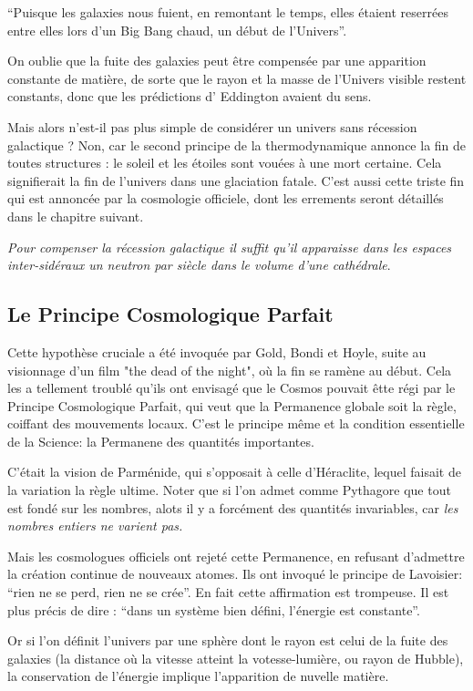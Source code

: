 \documentclass[a4paper,12pt]{article}
\begin{document}
``Puisque les galaxies nous fuient, en remontant le temps, elles étaient reserrées entre elles lors d'un Big Bang chaud, un début de l'Univers''.

On oublie que la fuite des galaxies peut être compensée par une apparition constante de matière, de sorte que le rayon et la masse de l'Univers visible restent constants, donc que les prédictions d' Eddington avaient du sens.

Mais alors n'est-il pas plus simple de considérer un univers sans récession galactique ? Non, car le second principe de la thermodynamique annonce la fin de toutes structures : le soleil et les étoiles sont vouées à une mort certaine. Cela signifierait la fin de l'univers dans une glaciation fatale.  C'est aussi cette triste fin qui est annoncée par la cosmologie officiele, dont les errements seront détaillés dans le chapitre suivant.

\textit{Pour compenser la récession galactique il suffit qu'il apparaisse dans les espaces inter-sidéraux un neutron par siècle dans le volume d'une cathédrale}.

\subsection{Le Principe Cosmologique Parfait}

Cette hypothèse cruciale a été invoquée par Gold, Bondi et Hoyle, suite au visionnage d'un film "the dead of the night", où la fin se ramène au début. Cela les a tellement troublé qu'ils ont envisagé que le Cosmos pouvait êtte régi par le  Principe Cosmologique Parfait, qui veut que la Permanence globale soit la règle, coiffant des mouvements locaux. C'est le principe même et la condition essentielle de la Science: la Permanene des quantités importantes.

C'était la vision de Parménide, qui s'opposait à celle d'Héraclite, lequel faisait de la variation la règle ultime. Noter que si l'on admet comme Pythagore que tout est fondé sur les nombres, alots il y a forcément des quantités invariables, car \textit{les nombres entiers ne varient pas.}

Mais les cosmologues officiels ont rejeté cette Permanence, en refusant d'admettre la création continue de nouveaux atomes. Ils ont invoqué le principe de Lavoisier: ``rien ne se perd, rien ne se crée''. En fait cette affirmation est trompeuse. Il est plus précis de dire : ``dans un système bien défini, l'énergie est constante''. 

Or si l'on définit l'univers par une sphère dont le rayon est celui de la fuite des galaxies (la distance où la vitesse atteint la votesse-lumière, ou rayon de Hubble), la conservation de l'énergie implique l'apparition de nuvelle matière. 
\end{document}
